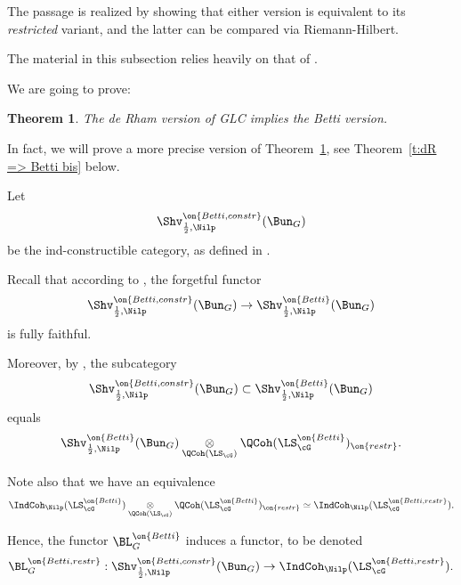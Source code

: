 \documentclass[9pt]{amsart}
\newtheorem{thm}[subsubsection]{Theorem}
\theoremstyle{remark}
\theoremstyle{definition}
\theoremstyle{remark}
\newcommand{\thmref}[1]{Theorem~\ref{#1}}
\numberwithin{equation}{section}
\begin{document}
\medskip

The passage is realized by showing that
either version is equivalent to its \emph{restricted} variant, and the latter can be compared via Riemann-Hilbert. 

\medskip

The material in this subsection relies heavily on that of \cite{AGKRRV}. 

\sssec{}

We are going to prove:

\begin{thm} \label{t:dR => Betti}
The de Rham version of GLC implies the Betti version.
\end{thm}

In fact, we will prove a more precise version of \thmref{t:dR => Betti}, see
\thmref{t:dR => Betti bis} below. 

\sssec{} \label{sss:Betti constr Nilp as ten}

Let 
$$\Shv^{\on{Betti,constr}}_{\frac{1}{2},\Nilp}(\Bun_G)$$
be the ind-constructible category, as defined in \cite[Sect. E.5]{AGKRRV}.

\medskip

Recall that according to \cite[Proposition 18.3.2]{AGKRRV}, the forgetful functor
$$\Shv^{\on{Betti,constr}}_{\frac{1}{2},\Nilp}(\Bun_G)\to \Shv^{\on{Betti}}_{\frac{1}{2},\Nilp}(\Bun_G)$$
is fully faithful.

\medskip

Moreover, by \cite[Theorem 18.3.6]{AGKRRV}, the subcategory 
\begin{equation} \label{e:Betti constr Nilp as ten}
\Shv^{\on{Betti,constr}}_{\frac{1}{2},\Nilp}(\Bun_G)\subset \Shv^{\on{Betti}}_{\frac{1}{2},\Nilp}(\Bun_G)
\end{equation}
equals
$$\Shv^{\on{Betti}}_{\frac{1}{2},\Nilp}(\Bun_G)\underset{\QCoh(\LS_\cG)}\otimes \QCoh(\LS^{\on{Betti}}_\cG)_{\on{restr}}.$$

Note also that we have an equivalence
\begin{equation} \label{e:restr as ten prod Betti}
\IndCoh_\Nilp(\LS^{\on{Betti}}_\cG)\underset{\QCoh(\LS_\cG)}\otimes \QCoh(\LS^{\on{Betti}}_\cG)_{\on{restr}}\simeq
\IndCoh_\Nilp(\LS^{\on{Betti,restr}}_\cG).
\end{equation} 

Hence, the functor $\BL^{\on{Betti}}_G$ induces a functor, to be denoted
$$\BL_G^{\on{Betti,restr}}:\Shv^{\on{Betti,constr}}_{\frac{1}{2},\Nilp}(\Bun_G)\to \IndCoh_\Nilp(\LS^{\on{Betti,restr}}_\cG).$$
\end{document}
